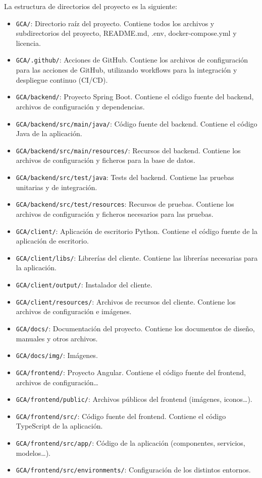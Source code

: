 La estructura de directorios del proyecto es la siguiente:
\begin{itemize}
    \tightlist
    \item\texttt{GCA/}: Directorio raíz del proyecto.
    Contiene todos los archivos y subdirectorios del proyecto,
    README.md, .env, docker-compose.yml y licencia.
    \item \texttt{GCA/.github/}: Acciones de GitHub.
    Contiene los archivos de configuración para las acciones de GitHub,
    utilizando workflows para la integración y despliegue continuo (CI/CD).
    \item\texttt{GCA/backend/}: Proyecto Spring Boot.
    Contiene el código fuente del backend, archivos de configuración y dependencias.
    \item \texttt{GCA/backend/src/main/java/}: Código fuente del backend.
    Contiene el código Java de la aplicación.
    \item \texttt{GCA/backend/src/main/resources/}: Recursos del backend.
    Contiene los archivos de configuración y ficheros para la base de datos.
    \item \texttt{GCA/backend/src/test/java}: Tests del backend.
    Contiene las pruebas unitarias y de integración.
    \item \texttt{GCA/backend/src/test/resources}: Recursos de pruebas.
    Contiene los archivos de configuración y ficheros necesarios para las pruebas.
    \item \texttt{GCA/client/}: Aplicación de escritorio Python.
    Contiene el código fuente de la aplicación de escritorio.
    \item \texttt{GCA/client/libs/}: Librerías del cliente.
    Contiene las librerías necesarias para la aplicación.
    \item \texttt{GCA/client/output/}: Instalador del cliente.
    \item \texttt{GCA/client/resources/}: Archivos de recursos del cliente.
    Contiene los archivos de configuración e imágenes.
    \item \texttt{GCA/docs/}: Documentación del proyecto.
    Contiene los documentos de diseño, manuales y otros archivos.
    \item \texttt{GCA/docs/img/}: Imágenes.
    \item \texttt{GCA/frontend/}: Proyecto Angular.
    Contiene el código fuente del frontend, archivos de configuración\ldots
    \item \texttt{GCA/frontend/public/}: Archivos públicos del frontend (imágenes, iconos\ldots).
    \item \texttt{GCA/frontend/src/}: Código fuente del frontend.
    Contiene el código TypeScript de la aplicación.
    \item \texttt{GCA/frontend/src/app/}: Código de la aplicación (componentes, servicios, modelos\ldots).
    \item \texttt{GCA/frontend/src/environments/}: Configuración de los distintos entornos.
\end{itemize}


